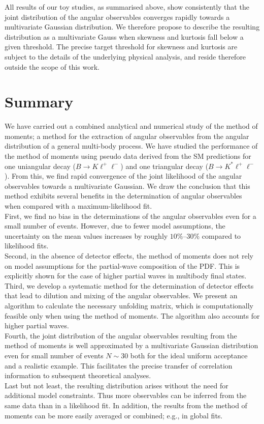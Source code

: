 \documentclass[aps,nofootinbib,preprintnumbers,prd,twocolumn]{revtex4-1}
\begin{document}
All results of our toy studies, as summarised above, show consistently that the joint distribution of the angular
observables converges rapidly towards a multivariate Gaussian distribution. We therefore propose to describe the
resulting distribution as a multivariate Gauss when skewness and kurtosis fall below a given threshold.
The precise target threshold for skewness and kurtosis are subject to the details of the underlying physical analysis,
and reside therefore outside the scope of this work.


\section{Summary}

We have carried out a combined analytical and numerical study of the method of
moments; a method for the extraction of angular observables from the angular
distribution of a general multi-body process.  We have studied the performance
of the method of moments using pseudo data derived from the SM predictions for
one uniangular decay ($B\to K\ell^+\ell^-$) and one triangular decay ($B\to
K^*\ell^+\ell^-$).  From this, we find rapid convergence of the joint
likelihood of the angular observables towards a multivariate Gaussian.  We draw
the conclusion that this method exhibits several benefits in the determination
of angular observables when compared with a maximum-likelihood fit.\\

First, we find no bias in the determinations of the angular
observables even for a small number of events.  However, due to fewer
model assumptions, the uncertainty on the mean values increases by
roughly $10\%$--$30\%$ compared
to likelihood fits.\\
Second, in the absence of detector effects, the method of moments does
not rely on model assumptions for the partial-wave composition of the
PDF. This is explicitly shown for the case of higher
partial waves in multibody final states.\\
Third, we develop a systematic method for the determination of
detector effects that lead to dilution and mixing of the angular
observables. We present an algorithm to calculate the necessary
unfolding matrix, which is computationally feasible only when using
the method
of moments. The algorithm also accounts for higher partial waves.\\
Fourth, the joint distribution of the angular observables resulting
from the method of moments is well approximated by a multivariate
Gaussian distribution even for small number of events $N \sim 30$ both
for the ideal uniform acceptance and a realistic example.  This
facilitates the precise transfer of correlation information
to subsequent theoretical analyses.\\
Last but not least, the resulting distribution arises without the need
for additional model constraints. Thus more observables can be
inferred from the same data than in a likelihood fit. In addition,
the results from the method of moments can be more easily averaged or combined; e.g., in global fits.\\
\end{document}
